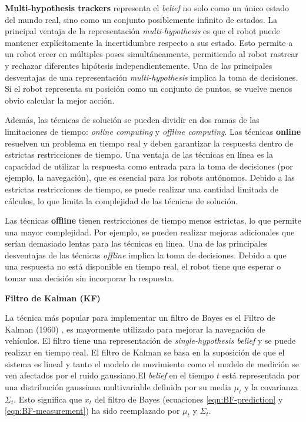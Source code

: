 \textbf{Multi-hypothesis trackers} representa el \textit{belief} no solo como un único estado del mundo real, sino como un conjunto posiblemente infinito de estados. La principal ventaja de la representación \textit{multi-hypothesis} es que el robot puede mantener explícitamente la incertidumbre respecto a sus estado. Esto permite a un robot creer en múltiples poses simultáneamente, permitiendo al robot rastrear y rechazar diferentes hipótesis independientemente. Una de las principales desventajas de una representación \textit{multi-hypothesis} implica la toma de decisiones. Si el robot representa su posición como un conjunto de puntos, se vuelve menos obvio calcular la mejor acción.

Además, las técnicas de solución se pueden dividir en dos ramas de las limitaciones de tiempo: \textit{online computing} y \textit{offline computing}. Las técnicas \textbf{online} resuelven un problema en tiempo real y deben garantizar la respuesta dentro de estrictas restricciones de tiempo. Una ventaja de las técnicas en línea es la capacidad de utilizar la respuesta como entrada para la toma de decisiones (por ejemplo, la navegación), que es esencial para los robots autónomos. Debido a las estrictas restricciones de tiempo, se puede realizar una cantidad limitada de cálculos, lo que limita la complejidad de las técnicas de solución.

Las técnicas \textbf{offline} tienen restricciones de tiempo menos estrictas, lo que permite una mayor complejidad. Por ejemplo, se pueden realizar mejoras adicionales que serían demasiado lentas para las técnicas en línea. Una de las principales desventajas de las técnicas \textit{offline} implica la toma de decisiones. Debido a que una respuesta no está disponible en tiempo real, el robot tiene que esperar o tomar una decisión sin incorporar la respuesta.

\textbf{Filtro de Kalman (KF)}

La técnica más popular para implementar un filtro de Bayes es el Filtro de Kalman (1960) \cite{kalman1960new}, es mayormente utilizado para mejorar la navegación de vehículos. El filtro tiene una representación de \textit{single-hypothesis belief} y se puede realizar en tiempo real. El filtro de Kalman se basa en la suposición de que el sistema es lineal y tanto el modelo de movimiento como el modelo de medición se ven afectados por el ruido gaussiano.El \textit{belief} en el tiempo $t$ está representada por una distribución gaussiana multivariable definida por su media $\mu_{t}$ y la covarianza $\Sigma_{t}$. Esto significa que $x_{t}$ del filtro de Bayes (ecuaciones \ref{eqn:BF-prediction} y \ref{eqn:BF-measurement}) ha sido reemplazado por $\mu_{t}$ y $\Sigma_{t}$.

